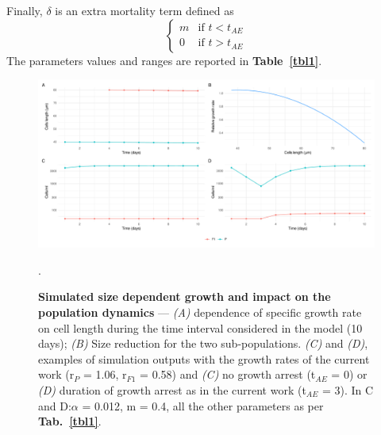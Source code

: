 \documentclass[a4paper,oneside]{article}
\begin{document}
    Finally, $\delta$ is an extra mortality term defined as
    \[
      \begin{cases}
        m & \mbox{if } t < t_{AE} \\
        0 & \mbox{if } t > t_{AE}
      \end{cases}
    \]
    The parameters values and ranges are reported in \textbf{Table~\ref{tbl1}}.
%
  
    \begin{figure}[p]
      \includegraphics[width=\linewidth]{imgs/Figpan.pdf}
      \caption{\textbf{Simulated size dependent growth and impact on the population dynamics} ---
        {\color{blue}\textit{(A)}} dependence of specific growth rate on cell length during the time interval considered in the model (10 days);
        {\color{blue}\textit{(B)}} Size reduction for the two sub-populations.
        {\color{blue}\textit{(C)}} and {\color{blue}\textit{(D)}}, examples of simulation outputs with the growth rates of the current work (r$_{P}$ = 1.06, r$_{F1}$ = 0.58) and {\color{blue}\textit{(C)}} no growth arrest (t$_{AE}$ = 0) or {\color{blue}\textit{(D)}} duration of growth arrest as in the current work (t$_{AE}$ = 3). In C and D:\@$\alpha$ = 0.012, m = 0.4, all the other parameters as per \textbf{Tab.~\ref{tbl1}}.
      }\label{fdyn}.
    \end{figure}
\end{document}
